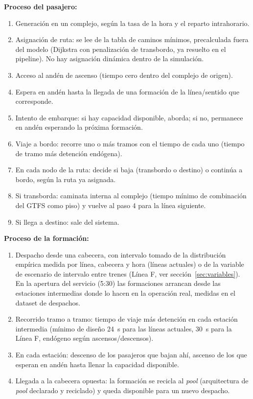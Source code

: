\documentclass{article}
\begin{document}
\textbf{Proceso del pasajero:}
\begin{enumerate}
  \item Generación en un complejo, según la tasa de la hora y el reparto
    intrahorario.
  \item Asignación de ruta: se lee de la tabla de caminos mínimos, precalculada
    fuera del modelo (Dijkstra con penalización de transbordo, ya resuelto en el
    pipeline). No hay asignación dinámica dentro de la simulación.
  \item Acceso al andén de ascenso (tiempo cero dentro del complejo de origen).
  \item Espera en andén hasta la llegada de una formación de la línea/sentido que
    corresponde.
  \item Intento de embarque: si hay capacidad disponible, aborda; si no, permanece
    en andén esperando la próxima formación.
  \item Viaje a bordo: recorre uno o más tramos con el tiempo de cada uno (tiempo de
    tramo más detención endógena).
  \item En cada nodo de la ruta: decide si baja (transbordo o destino) o continúa a
    bordo, según la ruta ya asignada.
  \item Si transborda: caminata interna al complejo (tiempo mínimo de combinación
    del GTFS como piso) y vuelve al paso 4 para la línea siguiente.
  \item Si llega a destino: sale del sistema.
\end{enumerate}

\textbf{Proceso de la formación:}
\begin{enumerate}
  \item Despacho desde una cabecera, con intervalo tomado de la distribución
    empírica medida por línea, cabecera y hora (líneas actuales) o de la variable
    de escenario de intervalo entre trenes (Línea F, ver
    sección~\ref{sec:variables}). En la apertura del servicio (5:30) las
    formaciones arrancan desde las estaciones intermedias donde lo hacen en la
    operación real, medidas en el dataset de despachos.
  \item Recorrido tramo a tramo: tiempo de viaje más detención en cada estación
    intermedia (mínimo de diseño 24~s para las líneas actuales, 30~s para la Línea
    F, endógeno según ascensos/descensos).
  \item En cada estación: descenso de los pasajeros que bajan ahí, ascenso de los
    que esperan en andén hasta llenar la capacidad disponible.
  \item Llegada a la cabecera opuesta: la formación se recicla al \textit{pool}
    (arquitectura de \textit{pool} declarado y reciclado) y queda disponible para
    un nuevo despacho.
\end{enumerate}
\end{document}
